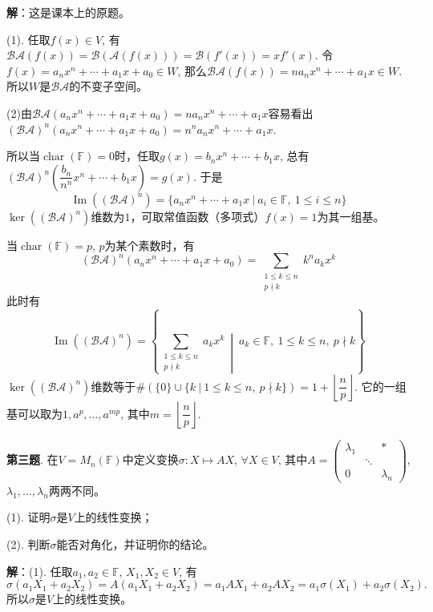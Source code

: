 {\bf 解}：这是课本上的原题。

(1). 任取$f(x) \in V$, 有$\mathscr{BA}(f(x)) = \mathscr{B}(\mathscr{A}(f(x))) = \mathscr{B}(f'(x)) = xf'(x)$. 令$f(x) = a_nx^n + \cdots + a_1x + a_0 \in W$, 那么$\mathscr{BA}(f(x)) = na_nx^n + \cdots + a_1x \in W$. 所以$W$是$\mathscr{BA}$的不变子空间。

(2)由$\mathscr{BA}(a_nx^n + \cdots + a_1x + a_0) = na_nx^n + \cdots + a_1x$容易看出$(\mathscr{BA})^n(a_nx^n + \cdots + a_1x + a_0) = n^na_nx^n + \cdots + a_1x$.

所以当$\operatorname{char}(\mathbb{F}) = 0$时，任取$g(x) = b_nx^n + \cdots + b_1x$, 总有$(\mathscr{BA})^n\left(\dfrac{b_n}{n^n} x^n + \cdots + b_1x\right) = g(x).$ 于是
$$\operatorname{Im}((\mathscr{BA})^n) = \{ a_nx^n + \cdots + a_1x \ |\ a_i\in\mathbb{F},~ 1\leqslant i \leqslant n \}$$
$\ker((\mathscr{BA})^n)$维数为$1$，可取常值函数（多项式）$f(x) = 1$为其一组基。

当$\operatorname{char}(\mathbb{F}) = p$, $p$为某个素数时，有
$$(\mathscr{BA})^n(a_nx^n + \cdots + a_1x + a_0) = \sum_{\substack{1\leqslant k \leqslant n \\ p\nmid k}} k^n a_k x^k$$
此时有
$$\operatorname{Im}((\mathscr{BA})^n) = \left\{ \sum_{\substack{1\leqslant k \leqslant n \\ p\nmid k}} a_k x^k \ \middle|\ a_k\in\mathbb{F},~ 1\leqslant k \leqslant n, ~ p\nmid k \right\}$$
$\ker((\mathscr{BA})^n)$维数等于$\# (\{ 0 \} \cup \{ k \ |\ 1\leqslant k \leqslant n, ~ p\nmid k \}) = 1 + \left\lfloor \dfrac{n}{p} \right\rfloor.$ 它的一组基可以取为$1, a^p, \ldots, a^{mp}$, 其中$m = \left\lfloor \dfrac{n}{p} \right\rfloor.$

\newpageorvspace


{\bf 第三题}. 在$V = M_n(\mathbb{F})$中定义变换$\sigma: X \mapsto AX$, $\forall X\in V$, 其中$A = \begin{pmatrix} \lambda_1 & & \ast \\ & \ddots & \\ 0 & & \lambda_n \end{pmatrix}$, $\lambda_1,\ldots,\lambda_n$两两不同。

(1). 证明$\sigma$是$V$上的线性变换；

(2). 判断$\sigma$能否对角化，并证明你的结论。

{\bf 解}：(1). 任取$a_1, a_2 \in \mathbb{F}$, $X_1, X_2 \in V$, 有
$$\sigma(a_1X_1 + a_2X_2) = A(a_1X_1 + a_2X_2) = a_1AX_1 + a_2AX_2 = a_1 \sigma(X_1) + a_2 \sigma(X_2).$$
所以$\sigma$是$V$上的线性变换。

